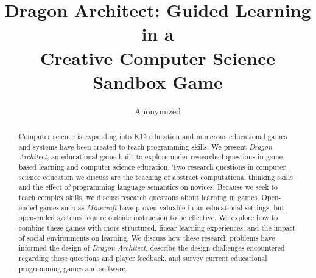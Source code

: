 \documentclass{sig-alternate}
\newcommand{\gametitle}{{\emph{Dragon Architect}}}
\begin{document}
%

\title{Dragon Architect: Guided Learning in a \\Creative Computer Science Sandbox Game}

\author{Anonymized}


\maketitle
\begin{abstract}
Computer science is expanding into K12 education and numerous educational games and systems have been created to teach programming skills. We present \gametitle{}, an educational game built to explore under-researched questions in game-based learning and computer science education. Two research questions in computer science education we discuss are the teaching of abstract computational thinking skills and the effect of programming language semantics on novices. Because we seek to teach complex skills, we discuss research questions about learning in games. Open-ended games such as \emph{Minecraft} have proven valuable in an educational settings, but open-ended systems require outside instruction to be effective. We explore how to combine these games with more structured, linear learning experiences, and the impact of social environments on learning. We discuss how these research problems have informed the design of \gametitle{}, describe the design challenges encountered regarding those questions and player feedback, and survey current educational programming games and software.
\end{abstract}
\end{document}
